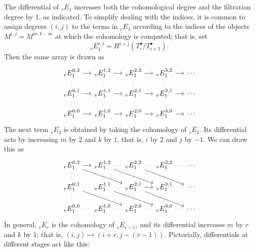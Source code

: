 The differential of $_{v}E_1$ increases both the cohomological degree and the filtration degree by $1$, as indicated. To simplify dealing with the indices, it is common 
to assign degrees $(i,j)$ to the terms in $_{v}E_1$ according to the indices of the objects $M^{i,j}=M^{m,k-m}$ at which the cohomology is computed; that is, set
\[_{v}E_1^{i,j}=H^{i+j}(T^\bullet_i/T^\bullet_{i+1}).\]
Then the same array is drawn as
\[\begin{tikzcd}[column sep=1.2 em,row sep=1.0 em]
_{v}E_1^{0,2}\ar[r]&_{v}E_1^{1,2}\ar[r]&_{v}E_1^{2,2}\ar[r]&_{v}E_1^{3,2}\ar[r]&\cdots\\
_{v}E_1^{0,1}\ar[r]\ar[u,no head,dotted]&_{v}E_1^{1,1}\ar[r]\ar[u,no head,dotted]&_{v}E_1^{2,1}\ar[r]\ar[u,no head,dotted]&_{v}E_1^{3,1}\ar[r]\ar[u,no head,dotted]&\cdots\\
_{v}E_1^{0,0}\ar[r]\ar[u,no head,dotted]&_{v}E_1^{1,0}\ar[r]\ar[u,no head,dotted]&_{v}E_1^{2,0}\ar[r]\ar[u,no head,dotted]&_{v}E_1^{3,0}\ar[r]\ar[u,no head,dotted]&\cdots
\end{tikzcd}\]
The next term $_{v}E_2$ is obtained by taking the cohomology of $_{v}E_1$. Its differential
acts by increasing $m$ by $2$ and $k$ by $1$, that is, $i$ by $2$ and $j$ by $-1$. We can draw
this as
\[\begin{tikzcd}[column sep=1.2 em,row sep=1.2 em]
_{v}E_1^{0,2}\ar[r]\ar[rrd]&_{v}E_1^{1,2}\ar[r,no head,dotted]\ar[rrd]&_{v}E_1^{2,2}\ar[r,no head,dotted]\ar[rrd]&_{v}E_1^{3,2}\ar[r,no head,dotted]&\cdots\\
_{v}E_1^{0,1}\ar[r,no head,dotted]\ar[u,no head,dotted]\ar[rrd]&_{v}E_1^{1,1}\ar[r,no head,dotted]\ar[u,no head,dotted]\ar[rrd]&_{v}E_1^{2,1}\ar[r]\ar[u,no head,dotted]\ar[rrd]&_{v}E_1^{3,1}\ar[r,no head,dotted]\ar[u,no head,dotted]&\cdots\\
_{v}E_1^{0,0}\ar[r,no head,dotted]\ar[u,no head,dotted]&_{v}E_1^{1,0}\ar[r,no head,dotted]\ar[u,no head,dotted]&_{v}E_1^{2,0}\ar[r,no head,dotted]\ar[u,no head,dotted]&_{v}E_1^{3,0}\ar[r,no head,dotted]\ar[u,no head,dotted]&\cdots
\end{tikzcd}\]
In general, $_{v}E_r$ is the cohomology of $_{v}E_{r-1}$, and its differential increases $m$ by $r$ and $k$ by $1$; that is, $(i,j)\mapsto(i+r,j-(r-1))$. Pictorially, differentials at different stages act like this:

